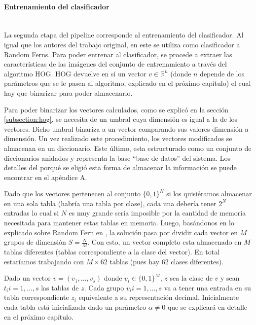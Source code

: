 		\paragraph{Entrenamiento del clasificador}  ~\\

			La segunda etapa del pipeline corresponde al entrenamiento del clasificador. Al igual que los autores del trabajo original, en este se utiliza como clasificador a Random Ferns. Para poder entrenar al clasificador, se procede a extraer las características de las imágenes del conjunto de entrenamiento a través del algoritmo HOG. HOG devuelve en sí un vector $v \in \mathbb{R}^{n}$ (donde $n$ depende de los parámetros que se le pasen al algoritmo, explicado en el próximo capítulo) el cual hay que binarizar para poder almacenarlo.

			Para poder binarizar los vectores calculados, como se explicó en la sección \ref{subsection:hog}, se necesita de un umbral cuya dimensión es igual a la de los vectores. Dicho umbral binariza a un vector comparando sus valores dimensión a dimensión. Un vez realizado este procedimiento, los vectores modificados se almacenan en un diccionario. Este último, esta estructurado como un conjunto de diccionarios anidados y representa la base ``base de datos'' del sistema. Los detalles del porqué se eligió esta forma de almacenar la información se puede encontrar en el apéndice A. 

			Dado que los vectores pertenecen al conjunto $\{ 0,1 \}^{N}$ si los quisiéramos almacenar en una sola tabla (habría una tabla por clase), cada una debería tener $2^{N}$ entradas lo cual si $N$ es muy grande sería imposible por la cantidad de memoria necesitada para mantener estas tablas en memoria. Luego, basándonos en lo explicado sobre Random Fern en \cite{subsection:ferns}, la solución pasa por dividir cada vector en $M$ grupos de dimensión $S = \frac{N}{M}$. Con esto, un vector completo esta almacenado en $M$ tablas diferentes (tablas correspondiente a la clase del vector). En total estaríamos trabajando con $M \times 62$ tablas (pues hay 62 clases diferentes).

			Dado un vector $v=(v_1, \dots, v_s)$ donde $v_i \in \{ 0,1 \}^{M}$, $z$ sea la clase de $v$ y sean $t_i i=1, \dots, s$ las tablas de $z$. Cada grupo $v_i i=1, \dots, s$ va a tener una entrada en su tabla correspondiente $z_i$ equivalente a su representación decimal. Inicialmente cada tabla está inicializada dado un parámetro $\alpha \neq 0$ que se explicará en detalle en el próximo capítulo.

